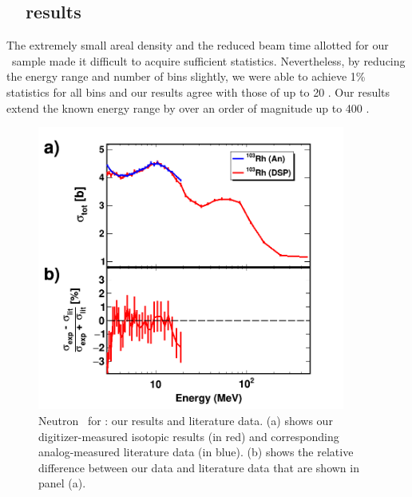 \subsection{\rhThree\ \tot\ results}
The extremely small areal density and the reduced beam
time allotted for our \rhThree\ sample made it difficult to acquire sufficient statistics.
Nevertheless, by reducing the energy range and number of bins slightly, we were
able to achieve 1\% statistics for all bins and our results agree with those of
\cite{Poenitz1983} up to 20 \mega\electronvolt. Our results extend the known energy range by over an order of
magnitude up to 400 \mega\electronvolt.
\begin{figure}[tb]
    \centering
    \includegraphics[width=0.9\textwidth]{figures/TwoPanelRh.png}
    \caption[Neutron \tot\ for \rhThree: our results and literature data]
    {
        Neutron \tot\ for \rhThree: our results and literature data.
        (a) shows our digitizer-measured isotopic results (in red) and
        corresponding analog-measured literature data \cite{Poenitz1983} (in blue).
        (b) shows the relative difference
        between our data and literature data that are shown in panel (a).
    }
    \label{TwoPanelRh}
\end{figure}

